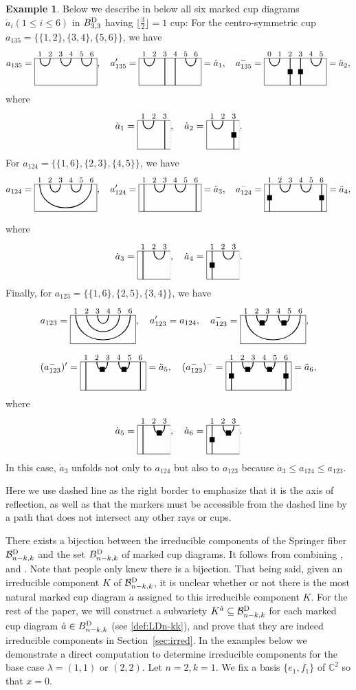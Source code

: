 \documentclass[11pt,reqno]{amsart}
\numberwithin{equation}{section}
\theoremstyle{definition}
\newtheorem{ex}[theorem]{Example}
\newcommand{\BD}{{B}^\textup{D}}
\newcommand{\cBD}{\mathcal{B}^\textup{D}}\newcommand{\CC}{\mathbb{C}}
\newcommand{\da}{\dot{a}}
\newcommand{\ld}{\lambda}
\newcommand{\mcupb}{
\begin{tikzpicture}[baseline={(0,-.3)}, scale = 0.8]
\draw (2.75,0) -- (1.25,0)  -- (1.25,-1.3) --  (2.75,-1.3);
\draw[dotted] (2.75,-1.3) -- (2.75,0);
\begin{footnotesize}
\node at (1.5,.2) {$1$};
\node at (2,.2) {$2$};
\node at (2.5,.2) {$3$};
\end{footnotesize}
\draw[thick] (1.5,0) -- (1.5, -1.3);
\draw[thick] (2,0) .. controls +(0,-.5) and +(0,-.5) .. +(.5,0);
\end{tikzpicture}
}
\newcommand{\fcupdm}{
\begin{tikzpicture}[baseline={(0,-.3)}, scale = 0.8]
\draw (-.25,0) -- (2.75,0) -- (2.75,-1.3) -- (-.25,-1.3) -- cycle;
\begin{footnotesize}
\node at (0,.2) {$0$};
\node at (.5,.2) {$1$};
\node at (1,.2) {$2$};
\node at (1.5,.2) {$3$};
\node at (2,.2) {$4$};
\node at (2.5,.2) {$5$};
\node at (1, -.65) {$\blacksquare$};
\node at (1.5, -.65) {$\blacksquare$};
\end{footnotesize}
\draw[thick] (0,0) .. controls +(0,-.5) and +(0,-.5) .. +(.5,0);
\draw[thick] (1,0) -- (1, -1.3);
\draw[thick] (1.5,0) -- (1.5, -1.3);
\draw[thick] (2,0) .. controls +(0,-.5) and +(0,-.5) .. +(.5,0);
\end{tikzpicture}
}
\newcommand{\mcupa}{
\begin{tikzpicture}[baseline={(0,-.3)}, scale = 0.8]
\draw (2.75,0) -- (1.25,0)  -- (1.25,-1.3) --  (2.75,-1.3);
\draw[dotted] (2.75,-1.3) -- (2.75,0);
\begin{footnotesize}
\node at (1.5,.2) {$1$};
\node at (2,.2) {$2$};
\node at (2.5,.2) {$3$};
\end{footnotesize}
\draw[thick] (2.5,0) -- (2.5, -1.3);
\draw[thick] (1.5,0) .. controls +(0,-.5) and +(0,-.5) .. +(.5,0);
\end{tikzpicture}
}
\newcommand{\fcupfp}{
\begin{tikzpicture}[baseline={(0,-.3)}, scale = 0.8]
\draw (-.25,0) -- (2.75,0) -- (2.75,-1.3) -- (-.25,-1.3) -- cycle;
\begin{footnotesize}
\node at (0,.2) {$1$};
\node at (.5,.2) {$2$};
\node at (1,.2) {$3$};
\node at (1.5,.2) {$4$};
\node at (2,.2) {$5$};
\node at (2.5,.2) {$6$};
\end{footnotesize}
\draw[thick] (0.5,0) .. controls +(0,-.5) and +(0,-.5) .. +(.5,0);
\draw[thick] (0,0) -- (0, -1.3);
\draw[thick] (2.5,0) -- (2.5, -1.3);
\draw[thick] (1.5,0) .. controls +(0,-.5) and +(0,-.5) .. +(.5,0);
\end{tikzpicture}
}
\newcommand{\fcupfm}{
\begin{tikzpicture}[baseline={(0,-.3)}, scale = 0.8]
\draw (-.25,0) -- (2.75,0) -- (2.75,-1.3) -- (-.25,-1.3) -- cycle;
\begin{footnotesize}
\node at (0,.2) {$1$};
\node at (.5,.2) {$2$};
\node at (1,.2) {$3$};
\node at (1.5,.2) {$4$};
\node at (2,.2) {$5$};
\node at (2.5,.2) {$6$};
\node at (0, -.65) {$\blacksquare$};
\node at (2.5, -.65) {$\blacksquare$};
\end{footnotesize}
\draw[thick] (0.5,0) .. controls +(0,-.5) and +(0,-.5) .. +(.5,0);
\draw[thick] (0,0) -- (0, -1.3);
\draw[thick] (2.5,0) -- (2.5, -1.3);
\draw[thick] (1.5,0) .. controls +(0,-.5) and +(0,-.5) .. +(.5,0);
\end{tikzpicture}
}
\newcommand{\mcupc}{
\begin{tikzpicture}[baseline={(0,-.3)}, scale = 0.8]
\draw (2.75,0) -- (1.25,0)  -- (1.25,-1.3) --  (2.75,-1.3);
\draw[dotted] (2.75,-1.3) -- (2.75,0);
\begin{footnotesize}
\node at (1.5,.2) {$1$};
\node at (1.5, -.65) {$\blacksquare$};
\node at (2,.2) {$2$};
\node at (2.25, -.35) {$\blacksquare$};
\node at (2.5,.2) {$3$};
\end{footnotesize}
\draw[thick] (1.5,0) -- (1.5, -1.3);
\draw[thick] (2,0) .. controls +(0,-.5) and +(0,-.5) .. +(.5,0);
\end{tikzpicture}
}
\newcommand{\fcupc}{
\begin{tikzpicture}[baseline={(0,-.3)}, scale = 0.8]
\draw (-.25,0) -- (2.75,0) -- (2.75,-1.3) -- (-.25,-1.3) -- cycle;
\begin{footnotesize}
\node at (0,.2) {$1$};
\node at (.5,.2) {$2$};
\node at (1,.2) {$3$};
\node at (1.5,.2) {$4$};
\node at (2,.2) {$5$};
\node at (2.5,.2) {$6$};
\end{footnotesize}
\draw[thick] (0,0) .. controls +(0,-1.5) and +(0,-1.5) .. +(2.5,0);
\draw[thick] (0.5,0) .. controls +(0,-1) and +(0,-1) .. +(1.5,0);
\draw[thick] (1,0) .. controls +(0,-.5) and +(0,-.5) .. +(.5,0);
\end{tikzpicture}
}
\newcommand{\mcupf}{
\begin{tikzpicture}[baseline={(0,-.3)}, scale = 0.8]
\draw (2.75,0) -- (1.25,0)  -- (1.25,-1.3) --  (2.75,-1.3);
\draw[dotted] (2.75,-1.3) -- (2.75,0);
\begin{footnotesize}
\node at (1.5,.2) {$1$};
\node at (1.5, -.65) {$\blacksquare$};
\node at (2,.2) {$2$};
\node at (2.5,.2) {$3$};
\end{footnotesize}
\draw[thick] (1.5,0) -- (1.5, -1.3);
\draw[thick] (2,0) .. controls +(0,-.5) and +(0,-.5) .. +(.5,0);
\end{tikzpicture}
}
\newcommand{\fcupd}{
\begin{tikzpicture}[baseline={(0,-.3)}, scale = 0.8]
\draw (-.25,0) -- (2.75,0) -- (2.75,-1.3) -- (-.25,-1.3) -- cycle;
\begin{footnotesize}
\node at (0,.2) {$1$};
\node at (.5,.2) {$2$};
\node at (1,.2) {$3$};
\node at (1.5,.2) {$4$};
\node at (2,.2) {$5$};
\node at (2.5,.2) {$6$};
\end{footnotesize}
\draw[thick] (0,0) .. controls +(0,-.5) and +(0,-.5) .. +(.5,0);
\draw[thick] (1,0) .. controls +(0,-.5) and +(0,-.5) .. +(.5,0);
\draw[thick] (2,0) .. controls +(0,-.5) and +(0,-.5) .. +(.5,0);
\end{tikzpicture}
}
\newcommand{\fcupdp}{
\begin{tikzpicture}[baseline={(0,-.3)}, scale = 0.8]
\draw (-.25,0) -- (2.75,0) -- (2.75,-1.3) -- (-.25,-1.3) -- cycle;
\begin{footnotesize}
\node at (0,.2) {$1$};
\node at (.5,.2) {$2$};
\node at (1,.2) {$3$};
\node at (1.5,.2) {$4$};
\node at (2,.2) {$5$};
\node at (2.5,.2) {$6$};
\end{footnotesize}
\draw[thick] (0,0) .. controls +(0,-.5) and +(0,-.5) .. +(.5,0);
\draw[thick] (1,0) -- (1, -1.3);
\draw[thick] (1.5,0) -- (1.5, -1.3);
\draw[thick] (2,0) .. controls +(0,-.5) and +(0,-.5) .. +(.5,0);
\end{tikzpicture}
}
\newcommand{\mcupe}{
\begin{tikzpicture}[baseline={(0,-.3)}, scale = 0.8]
\draw (2.75,0) -- (1.25,0)  -- (1.25,-1.3) --  (2.75,-1.3);
\draw[dotted] (2.75,-1.3) -- (2.75,0);
\begin{footnotesize}
\node at (1.5,.2) {$1$};
\node at (2,.2) {$2$};
\node at (2.25, -.35) {$\blacksquare$};
\node at (2.5,.2) {$3$};
\end{footnotesize}
\draw[thick] (1.5,0) -- (1.5, -1.3);
\draw[thick] (2,0) .. controls +(0,-.5) and +(0,-.5) .. +(.5,0);
\end{tikzpicture}
}
\newcommand{\fcupcm}{
\begin{tikzpicture}[baseline={(0,-.3)}, scale = 0.8]
\draw (-.25,0) -- (2.75,0) -- (2.75,-1.3) -- (-.25,-1.3) -- cycle;
\begin{footnotesize}
\node at (0,.2) {$1$};
\node at (.5,.2) {$2$};
\node at (1,.2) {$3$};
\node at (1.5,.2) {$4$};
\node at (2,.2) {$5$};
\node at (2.5,.2) {$6$};
\node at (.75, -.35) {$\blacksquare$};
\node at (1.75, -.35) {$\blacksquare$};
\end{footnotesize}
\draw[thick] (.5,0) .. controls +(0,-.5) and +(0,-.5) .. +(.5,0);
\draw[thick] (1.5,0) .. controls +(0,-.5) and +(0,-.5) .. +(.5,0);
\draw[thick] (0,0) .. controls +(0,-1.5) and +(0,-1.5) .. +(2.5,0);
\end{tikzpicture}
}
\newcommand{\fcupcmp}{
\begin{tikzpicture}[baseline={(0,-.3)}, scale = 0.8]
\draw (-.25,0) -- (2.75,0) -- (2.75,-1.3) -- (-.25,-1.3) -- cycle;
\begin{footnotesize}
\node at (0,.2) {$1$};
\node at (.5,.2) {$2$};
\node at (1,.2) {$3$};
\node at (1.5,.2) {$4$};
\node at (2,.2) {$5$};
\node at (2.5,.2) {$6$};
\node at (.75, -.35) {$\blacksquare$};
\node at (1.75, -.35) {$\blacksquare$};
\end{footnotesize}
\draw[thick] (.5,0) .. controls +(0,-.5) and +(0,-.5) .. +(.5,0);
\draw[thick] (1.5,0) .. controls +(0,-.5) and +(0,-.5) .. +(.5,0);
\draw[thick] (0,0) -- (0, -1.3);
\draw[thick] (2.5,0) -- (2.5, -1.3);
\end{tikzpicture}
}
\newcommand{\fcupcmm}{
\begin{tikzpicture}[baseline={(0,-.3)}, scale = 0.8]
\draw (-.25,0) -- (2.75,0) -- (2.75,-1.3) -- (-.25,-1.3) -- cycle;
\begin{footnotesize}
\node at (0,.2) {$1$};
\node at (.5,.2) {$2$};
\node at (1,.2) {$3$};
\node at (1.5,.2) {$4$};
\node at (2,.2) {$5$};
\node at (2.5,.2) {$6$};
\node at (.75, -.35) {$\blacksquare$};
\node at (1.75, -.35) {$\blacksquare$};
\node at (0, -.65) {$\blacksquare$};
\node at (2.5, -.65) {$\blacksquare$};
\end{footnotesize}
\draw[thick] (.5,0) .. controls +(0,-.5) and +(0,-.5) .. +(.5,0);
\draw[thick] (1.5,0) .. controls +(0,-.5) and +(0,-.5) .. +(.5,0);
\draw[thick] (0,0) -- (0, -1.3);
\draw[thick] (2.5,0) -- (2.5, -1.3);
\end{tikzpicture}
}
\newcommand{\mcupd}{
\begin{tikzpicture}[baseline={(0,-.3)}, scale = 0.8]
\draw (2.75,0) -- (1.25,0)  -- (1.25,-1.3) --  (2.75,-1.3);
\draw[dotted] (2.75,-1.3) -- (2.75,0);
\begin{footnotesize}
\node at (1.5,.2) {$1$};
\node at (2.5, -.65) {$\blacksquare$};
\node at (2,.2) {$2$};
\node at (2.5,.2) {$3$};
\end{footnotesize}
\draw[thick] (2.5,0) -- (2.5, -1.3);
\draw[thick] (1.5,0) .. controls +(0,-.5) and +(0,-.5) .. +(.5,0);
\end{tikzpicture}
}
\newcommand{\fcupf}{
\begin{tikzpicture}[baseline={(0,-.3)}, scale = 0.8]
\draw (-.25,0) -- (2.75,0) -- (2.75,-1.3) -- (-.25,-1.3) -- cycle;
\begin{footnotesize}
\node at (0,.2) {$1$};
\node at (.5,.2) {$2$};
\node at (1,.2) {$3$};
\node at (1.5,.2) {$4$};
\node at (2,.2) {$5$};
\node at (2.5,.2) {$6$};
\end{footnotesize}
\draw[thick] (.5,0) .. controls +(0,-.5) and +(0,-.5) .. +(.5,0);
\draw[thick] (1.5,0) .. controls +(0,-.5) and +(0,-.5) .. +(.5,0);
\draw[thick] (0,0) .. controls +(0,-1.5) and +(0,-1.5) .. +(2.5,0);
\end{tikzpicture}
}
\begin{document}
\begin{ex}
Below we describe in below all six marked cup diagrams $\da_i (1\leq i \leq 6)$ in $\BD_{3,3}$ having $\lfloor\frac{3}{2}\rfloor = 1$ cup:
For the centro-symmetric cup $a_{135} = \{\{1,2\}, \{3,4\}, \{5,6\}\}$, we have
\[
a_{135} = \fcupd,
\quad
a'_{135} = \fcupdp = \ddot{a}_1,
\quad
a^-_{135} = \fcupdm = \ddot{a}_2,
\]
where
\[
\da_1 = \mcupa,
\quad
\da_2 = \mcupd.
\]
For $a_{124} = \{\{1,6\}, \{2,3\}, \{4,5\}\}$, we have
\[
a_{124} = \fcupf,
\quad
a'_{124} = \fcupfp = \ddot{a}_3,
\quad
a^-_{124} = \fcupfm = \ddot{a}_4,
\]
where
\[
\da_3 = \mcupb,
\quad
\da_4 = \mcupf.
\]
Finally, for $a_{123} = \{\{1,6\}, \{2,5\}, \{3,4\}\}$, we have
\[
\begin{split}
&a_{123} = \fcupc,
\quad
a'_{123} = a_{124},
\quad
a^-_{123} = \fcupcm,
\\
&(a^-_{123})'=\fcupcmp= \ddot{a}_5,
\quad
(a^-_{123})^- =\fcupcmm= \ddot{a}_6,
\end{split}
\]
where
\[
\da_5 = \mcupe,
\quad
\da_6 = \mcupc.
\]
In this case, $\da_3$ unfolds not only to $a_{124}$ but also to $a_{123}$ because $\ddot{a}_3 \leq a_{124} \leq a_{123}$.

Here we use dashed line as the right border to emphasize that it is the axis of reflection, as well as that the markers must be accessible from the dashed line by a path that does not intersect any other rays or cups.
\end{ex}
\prop
There exists a bijection between the irreducible components of the Springer fiber $\cBD_{n-k,k}$ and the set $\BD_{n-k,k}$ of marked cup diagrams.
\endprop
\proof
It follows from combining \cite[Lemma~5.12]{ES16}, \cite[II.9.8]{Spa82} 
% 
and \cite[Lemmas~3.2.3, 3.3.3]{vL89}.
\endproof
\rmk
Note that people only knew there is a bijection. That being said, given an irreducible component $K$ of $\cBD_{n-k,k}$, it is unclear whether or not  there is the most natural marked cup diagram $\da$ assigned to this irreducible component $K$.
For the rest of the paper, we will construct a subvariety $K^{\da} \subseteq \cBD_{n-k,k}$
for each marked cup diagram $\da \in \BD_{n-k,k}$ (see \eqref{def:LDn-kk}), and prove that they are indeed irreducible components in Section~\ref{sec:irred}.
\endrmk
In the examples below we demonstrate a direct computation to determine irreducible components for the base case $\ld =(1,1)$ or $(2,2)$.  
\ex\label{ex:Ka11}
Let $n=2, k=1$. We fix a basis $\{e_1,f_1\}$ of $\CC^2$ so that $x = 0$. 
\end{document}
